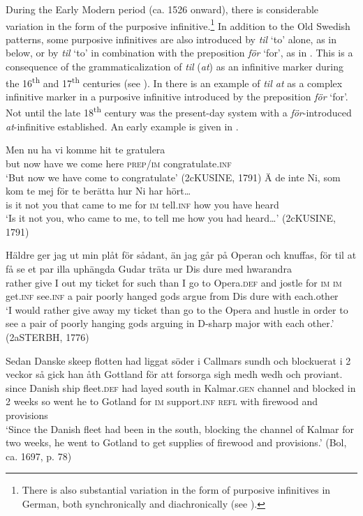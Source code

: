 \documentclass[output=paper]{langscibook}
\begin{document}
During the Early Modern period (ca. 1526 onward), there is considerable variation in the form of the purposive infinitive.\footnote{There is also substantial variation in the form of purposive infinitives in German, both synchronically and diachronically (see \citealt{Demske2011}).}  In addition to the Old Swedish patterns, some purposive infinitives are also introduced by \textit{til} ‘to’ alone, as in  below, or by \textit{til} ‘to’ in combination with the preposition \textit{för} ‘for’, as in . This is a consequence of the grammaticalization of \textit{til} (\textit{at}) as an infinitive marker during the 16\textsuperscript{th} and 17\textsuperscript{th} centuries (see \cites[]{Kalm2014}[]{Kalm2016Prepositioner}[203–221]{Kalm2016Satsekvivalenta}). In  there is an example of \textit{til at} as a complex infinitive marker in a purposive infinitive introduced by the preposition \textit{för} ‘for’. Not until the late 18\textsuperscript{th} century was the present-day system with a \textit{för}{}-introduced \textit{at}{}-infinitive established. An early example is given in . 


\ea
\label{ex:kalm:11}
\ea  \label{ex:kalm:11a}
\gll Men nu ha vi komme hit te gratulera\\
but now have we come here \textsc{prep}/\textsc{im} congratulate.\textsc{inf}\\
\glt ‘But now we have come to congratulate’ (2cKUSINE, 1791) 
\ex  \label{ex:kalm:11b}
\gll Ä de inte Ni, som kom te mej för te berätta hur Ni har hört…\\
is it not you that came to me for \textsc{im} tell.\textsc{inf} how you have heard\\
\glt ‘Is it not you, who came to me, to tell me how you had heard…’ (2cKUSINE, 1791)

\ex  \label{ex:kalm:11c}
\gll Häldre ger jag ut min plåt för sådant, än jag går på Operan och knuffas, för til at få se et par illa uphängda Gudar träta ur Dis dure med hwarandra\\
rather give I out my ticket for such than I go to Opera.\textsc{def} and jostle for \textsc{im} \textsc{im} get.\textsc{inf} see.\textsc{inf} a pair poorly hanged gods argue from Dis dure with each.other\\
\glt ‘I would rather give away my ticket than go to the Opera and hustle in order to see a pair of poorly hanging gods arguing in D-sharp major with each other.’ (2aSTERBH, 1776)

\ex \label{ex:kalm:11d}
\gll Sedan Danske skeep flotten had liggat söder i Callmars sundh och blockuerat i 2 veckor så gick han åth Gottland för att forsorga sigh medh wedh och proviant.\\
since Danish ship fleet.\textsc{def} had layed south in Kalmar.\textsc{gen} channel and blocked in 2 weeks so went he to Gotland for \textsc{im} support.\textsc{inf} \textsc{refl} with firewood and provisions\\ 
\glt ‘Since the Danish fleet had been in the south, blocking the channel of Kalmar for two weeks, he went to Gotland to get supplies of firewood and provisions.’ (Bol, ca. 1697, p. 78)
\z 
\z 
\end{document}
